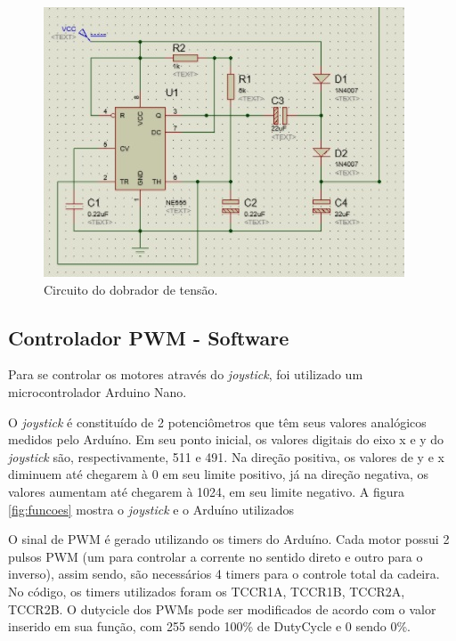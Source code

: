 \begin{figure}[h!]
  \centering
  \includegraphics[scale=0.9]{figuras/Dobrador.jpg}
  \caption{Circuito do dobrador de tensão.}
    \label{fig:dobrador}
\end{figure}

\subsection{Controlador PWM - Software}

Para se controlar os motores através do \textit{joystick}, foi utilizado um
microcontrolador Arduino Nano. 

O \textit{joystick} é constituído de 2 potenciômetros que têm seus valores
analógicos medidos pelo Arduíno. Em seu ponto inicial, os valores digitais do eixo x e y
do \textit{joystick} são, respectivamente, 511 e 491. Na direção positiva, os valores de
y e x diminuem até chegarem à 0 em seu limite positivo, já na direção negativa,
os valores aumentam até chegarem à 1024, em seu limite negativo. A figura
\ref{fig:funcoes} mostra o \textit{joystick} e o Arduíno utilizados

O sinal de PWM é gerado utilizando os timers do Arduíno. Cada motor possui 2 pulsos PWM (um para controlar a corrente no sentido direto e outro para o inverso), assim sendo, são necessários 4 timers para o controle total da cadeira. No código, os timers utilizados foram os TCCR1A, TCCR1B, TCCR2A, TCCR2B. O dutycicle dos PWMs pode ser modificados de acordo com o valor inserido em sua função, com 255 sendo 100\% de DutyCycle e 0 sendo 0\%.

